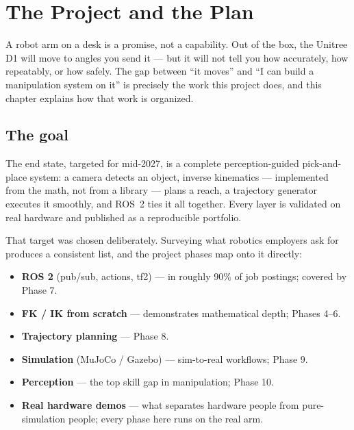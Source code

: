 \documentclass[11pt,twoside,openright]{book}
\begin{document}

\chapter{The Project and the Plan}\label{ch:project}

A robot arm on a desk is a promise, not a capability. Out of the box, the
Unitree D1 will move to angles you send it --- but it will not tell you how
accurately, how repeatably, or how safely. The gap between ``it moves'' and
``I can build a manipulation system on it'' is precisely the work this
project does, and this chapter explains how that work is organized.

\section{The goal}

The end state, targeted for mid-2027, is a complete perception-guided
pick-and-place system: a camera detects an object, inverse kinematics ---
implemented from the math, not from a library --- plans a reach, a
trajectory generator executes it smoothly, and ROS~2 ties it all together.
Every layer is validated on real hardware and published as a reproducible
portfolio.

That target was chosen deliberately. Surveying what robotics employers ask
for produces a consistent list, and the project phases map onto it directly:

\begin{itemize}
  \item \textbf{ROS 2} (pub/sub, actions, tf2) --- in roughly 90\% of job
    postings; covered by Phase 7.
  \item \textbf{FK / IK from scratch} --- demonstrates mathematical depth;
    Phases 4--6.
  \item \textbf{Trajectory planning} --- Phase 8.
  \item \textbf{Simulation} (MuJoCo / Gazebo) --- sim-to-real workflows;
    Phase 9.
  \item \textbf{Perception} --- the top skill gap in manipulation;
    Phase 10.
  \item \textbf{Real hardware demos} --- what separates hardware people
    from pure-simulation people; every phase here runs on the real arm.
\end{itemize}
\end{document}
